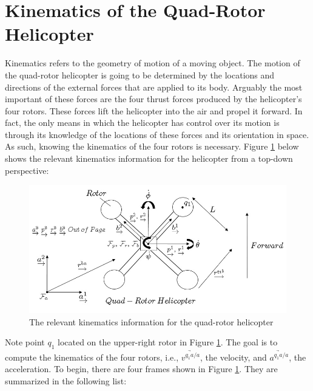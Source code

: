 \documentclass[journal]{IEEEtran}
\begin{document}
\section{Kinematics of the Quad-Rotor Helicopter}
\label{sec:kinematics_section}

Kinematics refers to the geometry of motion of a moving object. The motion of the quad-rotor helicopter is going to be determined by the locations and directions of the external forces that are applied to its body. Arguably the most important of these forces are the four thrust forces produced by the helicopter's four rotors. These forces lift the helicopter into the air and propel it forward. In fact, the only means in which the helicopter has control over its motion is through its knowledge of the locations of these forces and its orientation in space. As such, knowing the kinematics of the four rotors is necessary. Figure \ref{fig:helicopterkin} below shows the relevant kinematics information for the helicopter from a top-down perspective:

\begin{figure}[ht]
    \centering
        \includegraphics[width=.50\textwidth]{helicopterkin}
    \caption{The relevant kinematics information for the quad-rotor helicopter}
    \label{fig:helicopterkin}
\end{figure}

\pagebreak
Note point $q_1$ located on the upper-right rotor in Figure \ref{fig:helicopterkin}. The goal is to compute the kinematics of the four rotors, i.e., $\underrightarrow{v^{q_1a/a}}$, the velocity, and $\underrightarrow{a^{q_1a/a}}$, the acceleration. To begin, there are four frames shown in Figure \ref{fig:helicopterkin}. They are summarized in the following list:
\end{document}
